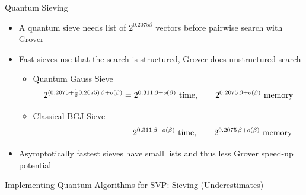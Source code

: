 \documentclass[table,10pt,aspectratio=169]{beamer}
\begin{document}
\begin{frame}[label={sec:org99aaf76}]{Quantum Sieving}
\begin{itemize}
\item A quantum sieve needs list of \(2^{0.2075 \beta}\) vectors before pairwise search with Grover

\item Fast sieves use that the search is structured, Grover does unstructured search
\begin{itemize}
\item Quantum Gauss Sieve \[2^{(0.2075 + \frac{1}{2} 0.2075)\, \beta + o(\beta)} = 2^{0.311\, \beta + o(\beta)} \textnormal{ time},\qquad 2^{0.2075\, \beta + o(\beta)} \textnormal{ memory}\]
\item Classical BGJ Sieve  \[\phantom{2^{(0.2075 + \frac{1}{2} 0.2075)\, \beta + o(\beta)} = }2^{0.311\, \beta + o(\beta)}\textnormal{ time}, \qquad 2^{0.2075\, \beta + o(\beta)} \textnormal{ memory}\]
\end{itemize}
\item Asymptotically fastest sieves have small lists and thus less Grover speed-up potential
\end{itemize}
\end{frame}

\begin{frame}[label={sec:org2b6bedf}]{Implementing Quantum Algorithms for SVP: Sieving (Underestimates)}
\tikzset{external/export=true}
\tikzset{external/export=false}


\scriptsize{


}
\end{frame}
\end{document}
